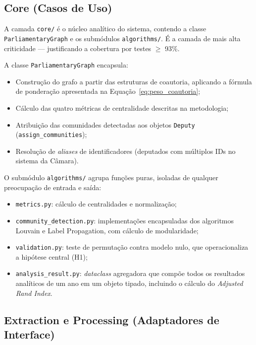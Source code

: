 \documentclass[
      12pt,
      a4paper,
      openright,
      oneside,
      chapter=TITLE,
      section=TITLE,
      english,
      french,
      spanish,
      brazilian
    ]{abntex2}
\begin{document}
    \subsection{Core (Casos de Uso)}
    
    A camada \texttt{core/} é o núcleo analítico do sistema, contendo a classe \texttt{ParliamentaryGraph} e os submódulos \texttt{algorithms/}. É a camada de mais alta criticidade --- justificando a cobertura por testes $\geq$ 93\%.
    
    A classe \texttt{ParliamentaryGraph} encapsula:
    
    \begin{itemize}
        \item Construção do grafo a partir das estruturas de coautoria, aplicando a fórmula de ponderação apresentada na Equação~\ref{eq:peso_coautoria};
        \item Cálculo das quatro métricas de centralidade descritas na metodologia;
        \item Atribuição das comunidades detectadas aos objetos \texttt{Deputy} (\texttt{assign\_communities});
        \item Resolução de \textit{aliases} de identificadores (deputados com múltiplos IDs no sistema da Câmara).
    \end{itemize}
    
    O submódulo \texttt{algorithms/} agrupa funções puras, isoladas de qualquer preocupação de entrada e saída:
    
    \begin{itemize}
        \item \texttt{metrics.py}: cálculo de centralidades e normalização;
        \item \texttt{community\_detection.py}: implementações encapsuladas dos algoritmos Louvain e Label Propagation, com cálculo de modularidade;
        \item \texttt{validation.py}: teste de permutação contra modelo nulo, que operacionaliza a hipótese central (H1);
        \item \texttt{analysis\_result.py}: \textit{dataclass} agregadora que compõe todos os resultados analíticos de um ano em um objeto tipado, incluindo o cálculo do \textit{Adjusted Rand Index}.
    \end{itemize}
    
    \subsection{Extraction e Processing (Adaptadores de Interface)}
    
\end{document}
